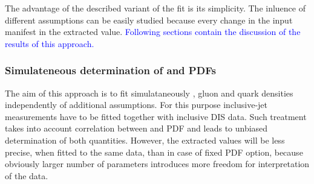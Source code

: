 The advantage of the described variant of the fit is its simplicity. The inluence of different assumptions can be easily studied because every change in the input manifest in the extracted \asz value. \textcolor{blue}{Following sections contain the discussion of the results of this approach.}

\subsubsection{Simulateneous determination of \asz and PDFs}
The aim of this approach is to fit simulataneously \asz, gluon and quark densities independently of additional assumptions. For this purpose inclusive-jet measurements have to be fitted together with inclusive DIS data. Such treatment takes into account correlation between \as and PDF and leads to unbiased determination of both quantities. However, the extracted values will be less precise, when fitted to the same data, than in case of fixed PDF option, because obviously larger number of parameters introduces more freedom for interpretation of the data.